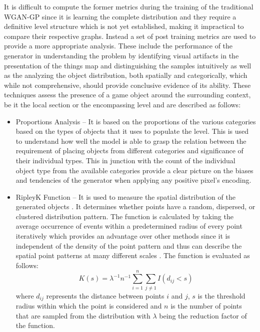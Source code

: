 \documentclass{Configuration_Files/PoliMi3i_thesis}
\begin{document}
It is difficult to compute the former metrics during the training of the traditional WGAN-GP 
since it is learning the complete distribution and they require a definitive level structure 
which is not yet established, making it impractical to compare their respective graphs. 
Instead a set of post training metrics are used to provide a more appropriate analysis. 
These include the performance of the generator in understanding the problem by 
identifying visual artifacts in the presentation of the things map and distinguishing 
the samples intuitively as well as the analyzing the object distribution, both spatially 
and categorically, which while not comprehensive, should provide conclusive 
evidence of its ability. These techniques assess the presence of a game object around 
the surrounding context, be it the local section or the encompassing level and are 
described as follows:
\begin{itemize}
\item Proportions Analysis – It is based on the proportions of the various categories 
based on the types of objects that it uses to populate the level. This is used to 
understand how well the model is able to grasp the relation between the 
requirement of placing objects from different categories and significance of 
their individual types. This in junction with the count of the individual object 
type from the available categories provide a clear picture on the biases and 
tendencies of the generator when applying any positive pixel’s encoding.
\item RipleyK Function – It is used to measure the spatial distribution of the generated 
objects \cite{BdR17}. It determines whether points have a random, dispersed, or 
clustered distribution pattern. The function is calculated by taking the average
 occurrence of events within a predetermined radius of every point iteratively 
which provides an advantage over other methods since it is independent of the density
 of the point pattern and thus can describe the spatial point patterns at many different 
scales \cite{LiW15}. The function is evaluated as follows:
\begin{equation} \label{eq:ripleyk}
K(s) = \lambda^{-1} n^{-1} \sum_{i=1}^n \sum_{j\neq 1} I(d_{ij}<s)
\end{equation}
where $d_{ij}$ represents the distance between points $i$ and $j$, $s$ is the threshold 
radius within which the point is considered and $n$ is the number of points 
that are sampled from the distribution with $\lambda$ being the reduction factor 
of the function. 
\end{itemize}
\newpage
\end{document}
